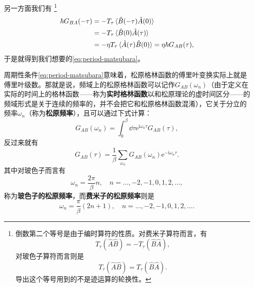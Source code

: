 \documentclass[hyperref, UTF8, a4paper]{ctexart}
\newcommand*{\ii}{\mathrm{i}}
\newcommand*{\ee}{\mathrm{e}}
\begin{document}
另一方面我们有%
\footnote{倒数第二个等号是由于编时算符的性质。对费米子算符而言，有
\[
    T_\tau (\hat{A} \hat{B}) = - T_\tau (\hat{B} \hat{A}),
\]
对玻色子算符而言则是
\[
    T_\tau (\hat{A} \hat{B}) = T_\tau (\hat{B} \hat{A}).
\]
导出这个等号用到的不是迹运算的轮换性。
}
\[
    \begin{aligned}
        \hbar G_{BA}(-\tau) &= - T_\tau  \expval*{\hat{B}(-\tau)\hat{A}(0)} \\
        &= - T_\tau \expval*{\hat{B}(0)\hat{A}(\tau)} \\
        &= - \eta T_\tau \expval*{\hat{A}(\tau)\hat{B}(0)} = \eta \hbar G_{AB}(\tau),
    \end{aligned}
\]
于是就得到我们想要的\eqref{eq:period-matsubara}。

周期性条件\eqref{eq:period-matsubara}意味着，松原格林函数的傅里叶变换实际上就是傅里叶级数。那就是说，频域上的松原格林函数可以记作$G_{AB}(\omega_n)$（由于定义在实际的时间上的格林函数——称为\textbf{实时格林函数}以和松原理论的虚时间区分——的频域形式是关于连续的频率的，并不会把它和松原格林函数混淆），它关于分立的频率$\omega_n$（称为\textbf{松原频率}），且可以通过下式计算：
\begin{equation}
    G_{AB}(\omega_n) = \int_0^\beta \dd{\tau} \ee^{\ii \omega_n \tau} G_{AB}(\tau),
\end{equation}
反过来就有
\begin{equation}
    G_{AB}(\tau) = \frac{1}{\beta} \sum_{\omega_n} G_{AB}(\omega_n) \ee^{- \ii \omega_n \tau}.
\end{equation}
其中对玻色子而言有
\begin{equation}
    \omega_n = \frac{2\pi}{\beta} n, \quad n = \ldots, -2, -1, 0, 1, 2, \ldots,
\end{equation}
称为\textbf{玻色子的松原频率}，而\textbf{费米子的松原频率}则是
\begin{equation}
    \omega_n = \frac{\pi}{\beta} (2n+1), \quad n = \ldots, -2, -1, 0, 1, 2, \ldots.
\end{equation}
\end{document}
